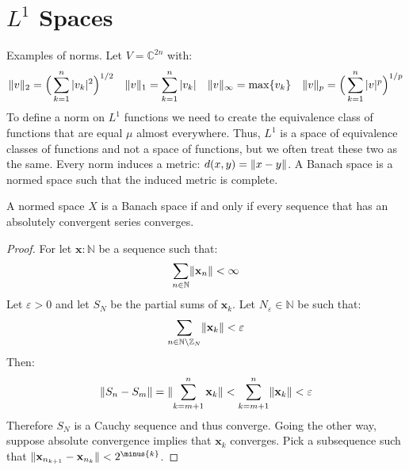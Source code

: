 \documentclass[crop=false,class=article]{standalone}                           %
\begin{document}
    \section{$L^{1}$ Spaces}
        Examples of norms. Let $V=\mathbb{C}^{2n}$ with:
        \begin{equation}
            \lVert v\rVert_{2}=\Big(\sum_{k=1}^{n}|v_{k}|^{2}\Big)^{1/2}
            \quad
            \lVert v\rVert_{1}=\sum_{k=1}^{n}|v_{k}|
            \quad
            \lVert v\rVert_{\infty}=\max\{v_{k}\}
            \quad
            \lVert v\rVert_{p}=\Big(\sum_{k=1}^{n}|v|^{p}\Big)^{1/p}
        \end{equation}
        To define a norm on $L^{1}$ functions we need to create the equivalence
        class of functions that are equal $\mu$ almost everywhere. Thus,
        $L^{1}$ is a space of equivalence classes of functions and not a space
        of functions, but we often treat these two as the same. Every norm
        induces a metric: $d(x,y)=\lVert x-y\rVert$. A Banach space is a normed space
        such that the induced metric is complete.
        \begin{theorem}
            A normed space $X$ is a Banach space if and only if every sequence
            that has an absolutely convergent series converges.
        \end{theorem}
        \begin{proof}
            For let $\mathbf{x}:\mathbb{N}$ be a sequence such that:
            \begin{equation}
                \sum_{n\in\mathbb{N}}\lVert\mathbf{x}_{n}\rVert<\infty
            \end{equation}
            Let $\varepsilon>0$ and let $S_{N}$ be the partial sums of
            $\mathbf{x}_{k}$. Let $N_{\varepsilon}\in\mathbb{N}$ be such that:
            \begin{equation}
                \sum_{n\in\mathbb{N}\setminus\mathbb{Z}_{N}}
                    \lVert\mathbf{x}_{k}\rVert<\varepsilon
            \end{equation}
            Then:
            \begin{equation}
                \lVert S_{n}-S_{m}\rVert=\lVert\sum_{k=m+1}^{n}\mathbf{x}_{k}\rVert
                <\sum_{k=m+1}^{n}\lVert\mathbf{x}_{k}\rVert<\varepsilon
            \end{equation}
            Therefore $S_{N}$ is a Cauchy sequence and thus converge. Going the
            other way, suppose absolute convergence implies that
            $\mathbf{x}_{k}$ converges. Pick a subsequence such that
            $\norm{\mathbf{x}_{n_{k+1}}-\mathbf{x}_{n_{k}}}<2^{\minus{k}}$.
        \end{proof}
\end{document}
